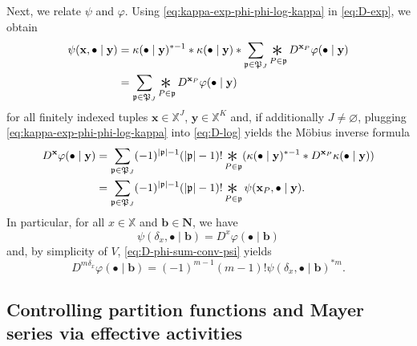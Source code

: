 \documentclass[10pt,a4paper]{amsart}
\newcommand{\X}{\mathbb X}
\newcommand{\be}{\begin{equation}}
\newcommand{\ee}{\end{equation}}
\newcommand{\Conv}{\mathop{\scalebox{2}{\raisebox{-0.275ex}{$\ast$}}}}
\begin{document}
Next, we relate $\psi$ and $\varphi$. 
Using \eqref{eq:kappa-exp-phi-phi-log-kappa} in \eqref{eq:D-exp}, we obtain
\begin{align*}
	\psi(\mathbf x, \bullet \mid \mathbf y) & = \kappa(\bullet \mid \mathbf y)^{\ast -1} \ast \kappa(\bullet \mid \mathbf y) \ast \sum_{\mathfrak p \in \mathfrak P_J} \Conv_{P \in \mathfrak p} D^{\mathbf x_P} \varphi(\bullet \mid \mathbf y) \\
	& = \sum_{\mathfrak p \in \mathfrak P_J} \Conv_{P \in \mathfrak p} D^{\mathbf x_P} \varphi(\bullet \mid \mathbf y)
\end{align*}
for all finitely indexed tuples $\mathbf x \in \X^J$, $\mathbf y \in \X^K$ and, if additionally $J \neq \varnothing$, plugging \eqref{eq:kappa-exp-phi-phi-log-kappa} into \eqref{eq:D-log} yields the M{\"o}bius inverse formula
\begin{align}
	D^\mathbf x \varphi(\bullet \mid \mathbf y) & = \sum_{\mathfrak p \in \mathfrak P_J} (-1)^{|\mathfrak p| - 1} (|\mathfrak p| - 1)! \Conv_{P \in \mathfrak p} (\kappa(\bullet \mid \mathbf y)^{\ast -1} \ast D^{\mathbf x_P} \kappa(\bullet \mid \mathbf y)) \notag \\
	& = \sum_{\mathfrak p \in \mathfrak P_J} (-1)^{|\mathfrak p| - 1} (|\mathfrak p| - 1)! \Conv_{P \in \mathfrak p} \psi(\mathbf x_P, \bullet \mid \mathbf y). \label{eq:D-phi-sum-conv-psi}
\end{align}
In particular, for all $x \in \X$ and $\mathbf b \in \mathbf N$, we have
\be \label{eq:psi-x-D-x-phi}
	\psi(\delta_x, \bullet \mid \mathbf b) = D^x \varphi(\bullet \mid \mathbf b)
\ee
and, by simplicity of $V$, \eqref{eq:D-phi-sum-conv-psi} yields
\be \label{eq:D-phi-hard-core-clique}
	D^{m\delta_x} \varphi(\bullet \mid \mathbf b) = (-1)^{m-1} (m-1)! \psi(\delta_x, \bullet \mid \mathbf b)^{\ast m}.
\ee

\subsection{Controlling partition functions and Mayer series via effective activities}
\end{document}
